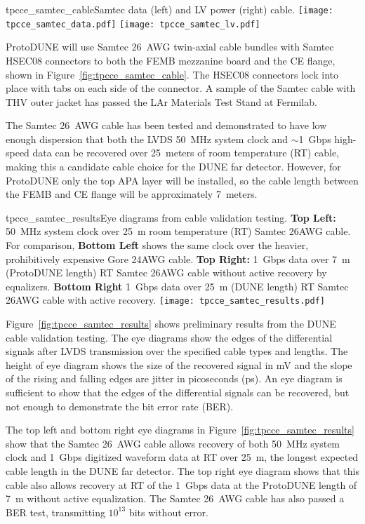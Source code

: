 \begin{cdrfigure}{tpcce_samtec_cable}{Samtec data (left) and LV power (right) cable.}
\texttt{[image: tpcce\_samtec\_data.pdf]}
\texttt{[image: tpcce\_samtec\_lv.pdf]}
\end{cdrfigure}

ProtoDUNE will use Samtec 26~AWG twin-axial cable bundles with Samtec HSEC08 connectors to both
the FEMB mezzanine board and the CE flange, shown in Figure~\ref{fig:tpcce_samtec_cable}. The HSEC08
connectors lock into place with tabs on each side of the connector. A sample of the Samtec cable with
THV outer jacket has passed the LAr Materials Test Stand at Fermilab.

The Samtec 26~AWG cable has been
tested and demonstrated to have low enough dispersion that both the LVDS 50~MHz system clock and
$\sim$1~Gbps high-speed data can be recovered over 25~meters of room temperature (RT) cable, making this
a candidate cable choice for the DUNE far detector. However, for ProtoDUNE only the top APA
layer will be installed, so the cable length between the FEMB and CE flange will be approximately 7~meters.

\begin{cdrfigure}{tpcce_samtec_results}{Eye diagrams 
from cable validation testing. {\bf Top Left:} 50~MHz system clock over 25~m room temperature 
(RT) Samtec 26AWG cable. For comparison, {\bf Bottom Left} shows the same clock over 
the heavier, prohibitively expensive Gore 24AWG cable. {\bf Top Right:} 1~Gbps data over 
7~m (ProtoDUNE length) RT Samtec 26AWG cable without active recovery by equalizers. {\bf Bottom Right} 1~Gbps
data over 25~m (DUNE length) RT Samtec 26AWG cable with active recovery.}
\texttt{[image: tpcce\_samtec\_results.pdf]}
\end{cdrfigure}

Figure~\ref{fig:tpcce_samtec_results} shows preliminary results from the DUNE cable 
validation testing. The eye diagrams show the edges of the differential signals after 
LVDS transmission over the specified cable types and lengths. The height of eye diagram shows the size 
of the recovered signal in mV and the slope of the rising and falling edges are jitter in picoseconds (ps). 
An eye diagram is sufficient to show that the edges of the differential signals can
be recovered, but not enough to demonstrate the bit error rate (BER).

The top left and bottom right eye diagrams in Figure~\ref{fig:tpcce_samtec_results} show 
that the Samtec 26~AWG cable allows recovery of both 50~MHz system clock and 1~Gbps digitized waveform 
data at RT over 25~m, the longest expected cable length in the DUNE far detector. 
The top right eye diagram shows that this cable also allows recovery at RT of the 1~Gbps data 
at the ProtoDUNE length of 7~m without active equalization. 
The Samtec 26~AWG cable has 
also passed a BER test, transmitting $10^{13}$ bits without error.

